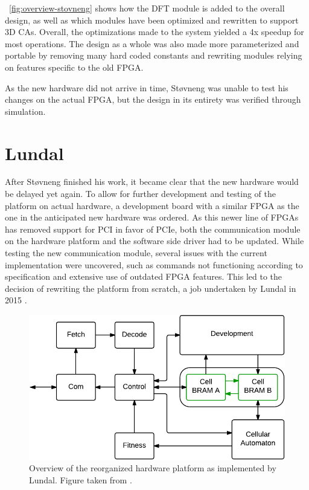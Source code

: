 \figurename~\ref{fig:overview-stovneng} shows how the DFT module is added to the
overall design, as well as which modules have been optimized and rewritten to
support 3D CAs. Overall, the optimizations made to the system yielded a 4x
speedup for most operations. The design as a whole was also made more
parameterized and portable by removing many hard coded constants and rewriting
modules relying on features specific to the old FPGA.

As the new hardware did not arrive in time, Støvneng was unable to test his
changes on the actual FPGA, but the design in its entirety was verified through
simulation.

\section{Lundal}

After Støvneng finished his work, it became clear that the new hardware would be
delayed yet again. To allow for further development and testing of the platform
on actual hardware, a development board with a similar FPGA as the one in the
anticipated new hardware was ordered. As this newer line of FPGAs has removed
support for PCI in favor of PCIe, both the communication module on the hardware
platform and the software side driver had to be updated. While testing the new
communication module, several issues with the current implementation were uncovered,
such as commands not functioning according to specification and extensive use of
outdated FPGA features. This led to the decision of rewriting the platform from
scratch, a job undertaken by Lundal in 2015 \cite{Lundal2015a}.


\begin{figure}[ht]
  \centering
  \includegraphics[width=0.8\linewidth]{fig/lundal-implementation-simple}
  \caption[Lundal's hardware design]{
    Overview of the reorganized hardware platform as implemented by Lundal.
    Figure taken from \cite{Lundal2015a}. \label{fig:lundal-implementation-simple}
  }
\end{figure}

